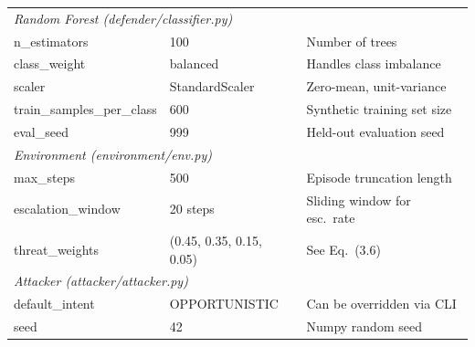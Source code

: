 \begin{longtable}{p{4.2cm}p{2.8cm}p{5.5cm}}
  \multicolumn{3}{l}{\textit{Random Forest (defender/classifier.py)}} \\[2pt]
  n\_estimators      & 100         & Number of trees \\
  class\_weight      & balanced    & Handles class imbalance \\
  scaler             & StandardScaler & Zero-mean, unit-variance \\
  train\_samples\_per\_class & 600 & Synthetic training set size \\
  eval\_seed         & 999         & Held-out evaluation seed \\[6pt]

  \multicolumn{3}{l}{\textit{Environment (environment/env.py)}} \\[2pt]
  max\_steps         & 500         & Episode truncation length \\
  escalation\_window & 20 steps    & Sliding window for esc.\ rate \\
  threat\_weights    & (0.45, 0.35, 0.15, 0.05) & See Eq.~(3.6) \\[6pt]

  \multicolumn{3}{l}{\textit{Attacker (attacker/attacker.py)}} \\[2pt]
  default\_intent    & OPPORTUNISTIC & Can be overridden via CLI \\
  seed               & 42          & Numpy random seed \\
\end{longtable}
